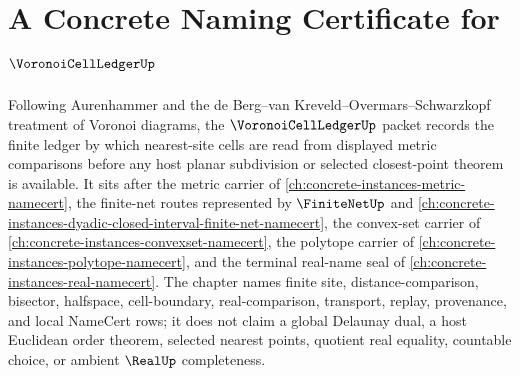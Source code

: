 \chapter{A Concrete Naming Certificate for $\VoronoiCellLedgerUp$}
\label{ch:concrete-instances-voronoi-cell-ledger-namecert}

Following Aurenhammer and the de Berg--van Kreveld--Overmars--Schwarzkopf treatment of Voronoi diagrams, the $\VoronoiCellLedgerUp$ packet records the finite ledger by which nearest-site cells are read from displayed metric comparisons before any host planar subdivision or selected closest-point theorem is available. It sits after the metric carrier of \autoref{ch:concrete-instances-metric-namecert}, the finite-net routes represented by $\FiniteNetUp$ and \autoref{ch:concrete-instances-dyadic-closed-interval-finite-net-namecert}, the convex-set carrier of \autoref{ch:concrete-instances-convexset-namecert}, the polytope carrier of \autoref{ch:concrete-instances-polytope-namecert}, and the terminal real-name seal of \autoref{ch:concrete-instances-real-namecert}. The chapter names finite site, distance-comparison, bisector, halfspace, cell-boundary, real-comparison, transport, replay, provenance, and local NameCert rows; it does not claim a global Delaunay dual, a host Euclidean order theorem, selected nearest points, quotient real equality, countable choice, or ambient $\RealUp$ completeness.

